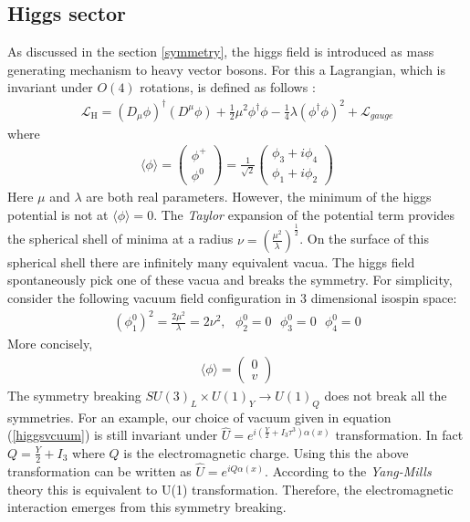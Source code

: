 \subsection{Higgs sector}\label{higgssec}
As discussed in the section \ref{symmetry}, the higgs field is introduced as mass generating mechanism to heavy vector bosons. For this a Lagrangian, which is invariant under $O(4)$ rotations, is defined as follows \cite{Manohar:2000dt, Lancaster:2014pza, LlewellynSmith:1973yud}: 
\begin{eqnarray}\label{higgsLagrangian}
\mathcal{L}_{\mathrm{H}}=\left(D_{\mu} \phi\right)^{\dagger}\left(D^{\mu} \phi\right)+\frac{1}{2}\mu^{2} \phi^{\dagger} \phi-\frac{1}{4}\lambda\left(\phi^{\dagger} \phi\right)^{2}+\mathcal{L}_{gauge}
\end{eqnarray}
where 
\begin{eqnarray}
\langle\phi\rangle=\left(\begin{array}{l}{\phi^+} \\ {\phi^0}\end{array}\right)=\frac{1}{\sqrt{2}}\left(\begin{array}{l}{\phi_3+i\phi_4} \\ {\phi_1+i\phi_2}\end{array}\right)
\end{eqnarray}
Here $\mu$ and $\lambda$ are both real parameters. However, the minimum of the higgs potential is not at $\langle\phi\rangle=0$. The \textit{Taylor} expansion of the potential term provides the spherical shell of minima at a radius $\nu=\left(\frac{\mu^2}{\lambda}\right)^{\frac{1}{2}}$. On the surface of this spherical shell there are infinitely many equivalent vacua. The higgs field spontaneously pick one of these vacua and breaks the symmetry. For simplicity, consider the following vacuum field configuration in 3 dimensional isospin space:
\begin{eqnarray}
(\phi_1^0)^2=\frac{2\mu^2}{\lambda}=2\nu^2, \text{  } \phi_2^0=0\text{  }\phi_3^0=0\text{  }\phi_4^0=0
\end{eqnarray}
More concisely, 
\begin{eqnarray}\label{higgsvcuum}
\langle\phi\rangle=\left(\begin{array}{l}{0} \\ {v}\end{array}\right)
\end{eqnarray}
The symmetry breaking $SU(3)_L\times U(1)_Y\rightarrow U(1)_Q$ does not break all the symmetries. For an example, our choice of vacuum given in equation (\ref{higgsvcuum}) is still invariant under $\hat{U}=e^{i(\frac{Y}{2}+I_3\tau^3)\alpha(x)}$ transformation. In fact $Q=\frac{Y}{2}+I_3$ where $Q$ is the electromagnetic charge. Using this the above transformation can be written as  $\hat{U}=e^{iQ\alpha(x)}$. According to the \textit{Yang-Mills} theory this is equivalent to U(1) transformation. Therefore, the electromagnetic interaction emerges from this symmetry breaking. \\
